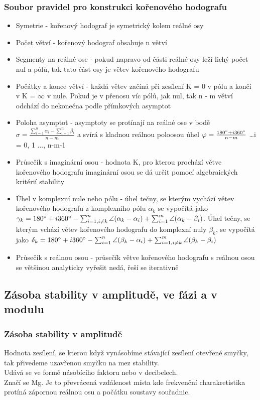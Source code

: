 \subsubsection*{Soubor pravidel pro konstrukci kořenového hodografu}
\begin{itemize}
    \item Symetrie - kořenový hodograf je symetrický kolem reálné osy
    \item Počet větví - kořenový hodograf obsahuje n větví
    \item Segmenty na reálné ose - pokud napravo od části reálné osy leží lichý počet nul a pólů, tak tato část osy je větev kořenového hodografu
    \item Počátky a konce větví - každá větev začíná při zesílení K = 0 v pólu a končí v K = $\infty$ v nule. Pokud je v přenosu víc pólů, jak nul, tak n - m větví odchází do nekonečna podle přímkových asymptot
    \item Poloha asymptot - asymptoty se protínají na reálné ose v bodě $\sigma = \frac{\sum^n_{i=1} \alpha_i - \sum^m_{i=1}\beta_i}{n-m}$ a svírá s kladnou reálnou poloosou úhel $\varphi = \frac{180 \degree + i360\degree}{n - m}$ \dots i = 0, 1 ..., n-m-1
    \item Průsečík s imaginární osou - hodnota K, pro kterou prochází větve kořenového hodografu imaginární osou se dá určit pomocí algebraických kritérií stability
    \item Úhel v komplexní nule nebo pólu - úhel tečny, se kterým vychází větev kořenového hodografu z komplexního pólu $\alpha_k$ se vypočítá jako $\gamma_k = 180 \degree + i360 \degree -\sum^n_{i=1, i\neq k}\angle(\alpha_k - \alpha_i) + \sum^m_{i=1}\angle(\alpha_k - \beta_i)$. Úhel tečny, se kterým vchází větev kořenového hodografu do komplexní nuly $\beta_k$, se vypočítá jako $\delta_k = 180 \degree + i360 \degree -\sum^n_{i=1}\angle(\beta_k - \alpha_i) + \sum^m_{i=1, i\neq k}\angle(\beta_k - \beta_i)$
    \item Průsečík s reálnou osou - průsečík větve kořenového hodografu s reálnou osou se většinou analyticky vyřešit nedá, řeší se iterativně
\end{itemize}
\subsection*{Zásoba stability v amplitudě, ve fázi a v modulu}
\subsubsection*{Zásoba stability v amplitudě}
Hodnota zesílení, se kterou když vynásobíme stávající zesílení otevřené smyčky, tak přivedeme uzavřenou smyčku na mez stability.\\
Udává se ve formě násobícího faktoru nebo v decibelech.\\
Značí se Mg. Je to převrácená vzdálenost místa kde frekvenční charakretistika protíná zápornou reálnou osu a počátku soustavy souřadnic.\\

